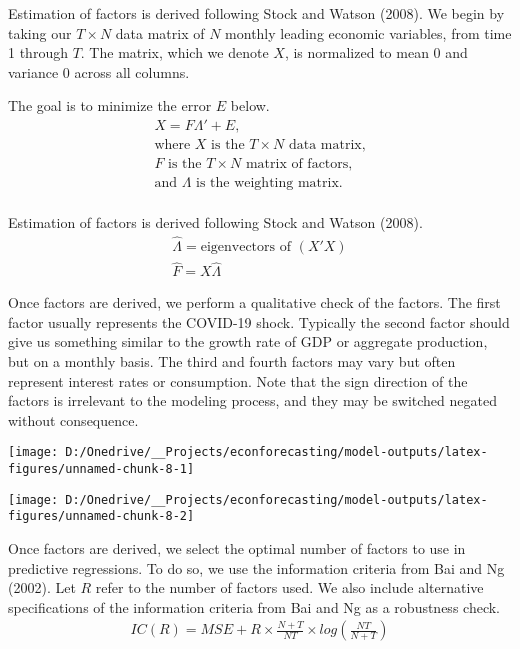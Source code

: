 \documentclass[11pt, letterpaper]{article}\usepackage[]{graphicx}\usepackage[]{color}
\begin{document}
Estimation of factors is derived following Stock and Watson (2008). We begin by taking our $T \times N$ data matrix of $N$ monthly leading economic variables, from time 1 through $T$. The matrix, which we denote $X$, is normalized to mean 0 and variance 0 across all columns.

The goal is to minimize the error $E$ below.
\begin{align*}
	X = F  \Lambda ' + E,\\
	\text{where $X$ is the $T \times N$ data matrix,}\\
	\text{$F$ is the $T \times N$ matrix of factors,}\\
	\text{and $\Lambda$ is the weighting matrix.}\\
\end{align*}

Estimation of factors is derived following Stock and Watson (2008).
\begin{align*}
	\widehat{\Lambda} = \text{eigenvectors of } (X'X)\\
	\widehat{F} = X \widehat{\Lambda}
\end{align*}

Once factors are derived, we perform a qualitative check of the factors. The first factor usually represents the COVID-19 shock. Typically the second factor should give us something similar to the growth rate of GDP or aggregate production, but on a monthly basis. The third and fourth factors may vary but often represent interest rates or consumption. Note that the sign direction of the factors is irrelevant to the modeling process, and they may be switched negated without consequence. 



{\centering \texttt{[image: D:/Onedrive/\_\_Projects/econforecasting/model-outputs/latex-figures/unnamed-chunk-8-1]} 

}




{\centering \texttt{[image: D:/Onedrive/\_\_Projects/econforecasting/model-outputs/latex-figures/unnamed-chunk-8-2]} 

}





Once factors are derived, we select the optimal number of factors to use in predictive regressions. To do so, we use the information criteria from Bai and Ng (2002). Let $R$ refer to the number of factors used. We also include alternative specifications of the information criteria from Bai and Ng as a robustness check.
\begin{align*}
	IC(R) = MSE + R \times \frac{N+T}{NT} \times log\left(\frac{NT}{N+T}\right)
\end{align*}
\end{document}
